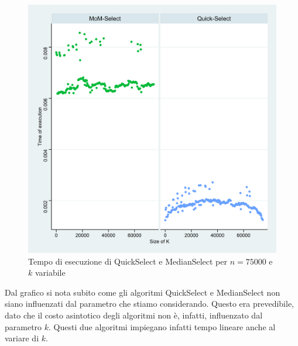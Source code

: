 \documentclass{article}
\begin{document}
	\begin{figure}[h!]
  		\includegraphics[width=\linewidth]{images/MoM_Quick_graph.png}
  		\caption{Tempo di esecuzione di QuickSelect e MedianSelect per $n=75000$ e $k$ variabile}
  		\label{fig:graph3}
	\end{figure}
	
	Dal grafico si nota subito come gli algoritmi QuickSelect e MedianSelect non siano influenzati dal parametro che stiamo considerando. Questo era prevedibile, dato che il costo asintotico degli algoritmi non è, infatti, influenzato dal parametro $k$. Questi due algoritmi impiegano infatti tempo lineare anche al variare di $k$.
	\newpage
	
\end{document}
